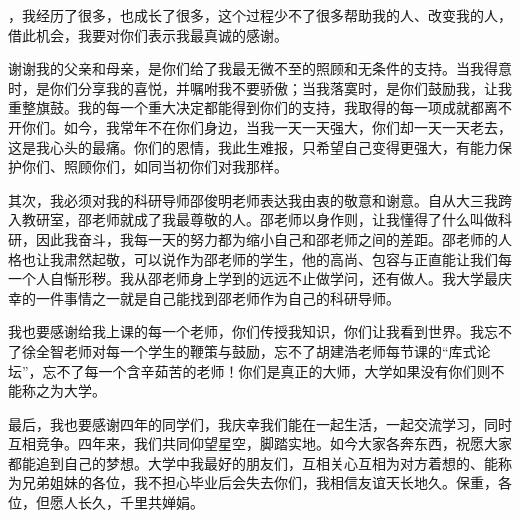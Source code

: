 

，我经历了很多，也成长了很多，这个过程少不了很多帮助我的人、改变我的人，借此机会，我要对你们表示我最真诚的感谢。

谢谢我的父亲和母亲，是你们给了我最无微不至的照顾和无条件的支持。当我得意时，是你们分享我的喜悦，并嘱咐我不要骄傲；当我落寞时，是你们鼓励我，让我重整旗鼓。我的每一个重大决定都能得到你们的支持，我取得的每一项成就都离不开你们。如今，我常年不在你们身边，当我一天一天强大，你们却一天一天老去，这是我心头的最痛。你们的恩情，我此生难报，只希望自己变得更强大，有能力保护你们、照顾你们，如同当初你们对我那样。

其次，我必须对我的科研导师邵俊明老师表达我由衷的敬意和谢意。自从大三我跨入教研室，邵老师就成了我最尊敬的人。邵老师以身作则，让我懂得了什么叫做科研，因此我奋斗，我每一天的努力都为缩小自己和邵老师之间的差距。邵老师的人格也让我肃然起敬，可以说作为邵老师的学生，他的高尚、包容与正直能让我们每一个人自惭形秽。我从邵老师身上学到的远远不止做学问，还有做人。我大学最庆幸的一件事情之一就是自己能找到邵老师作为自己的科研导师。

我也要感谢给我上课的每一个老师，你们传授我知识，你们让我看到世界。我忘不了徐全智老师对每一个学生的鞭策与鼓励，忘不了胡建浩老师每节课的“库式论坛”，忘不了每一个含辛茹苦的老师！你们是真正的大师，大学如果没有你们则不能称之为大学。

最后，我也要感谢四年的同学们，我庆幸我们能在一起生活，一起交流学习，同时互相竞争。四年来，我们共同仰望星空，脚踏实地。如今大家各奔东西，祝愿大家都能追到自己的梦想。大学中我最好的朋友们，互相关心互相为对方着想的、能称为兄弟姐妹的各位，我不担心毕业后会失去你们，我相信友谊天长地久。保重，各位，但愿人长久，千里共婵娟。

\newpage\mbox{}\thispagestyle{empty}\newpage

